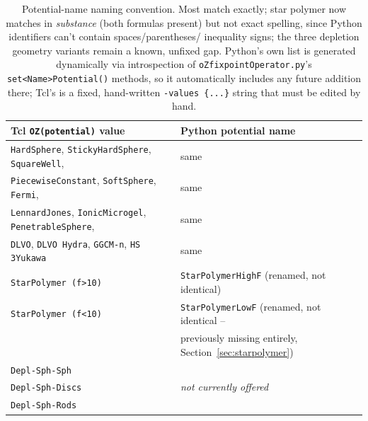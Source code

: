 \documentclass[11pt,a4paper]{article}
\newcommand{\code}[1]{\texttt{#1}}
\begin{document}
\begin{table}[h]
\centering
\small
\begin{tabular}{ll}
\toprule
Tcl \code{OZ(potential)} value & Python potential name \\
\midrule
\code{HardSphere}, \code{StickyHardSphere}, \code{SquareWell}, & same \\
\code{PiecewiseConstant}, \code{SoftSphere}, \code{Fermi}, & same \\
\code{LennardJones}, \code{IonicMicrogel}, \code{PenetrableSphere}, & same \\
\code{DLVO}, \code{DLVO Hydra}, \code{GGCM-n}, \code{HS 3Yukawa} & same \\
\code{StarPolymer (f>10)} & \code{StarPolymerHighF} (renamed, not identical) \\
\code{StarPolymer (f<10)} & \code{StarPolymerLowF} (renamed, not identical --\\
& previously missing entirely, Section~\ref{sec:starpolymer}) \\
\code{Depl-Sph-Sph} & \multirow{3}{*}{\emph{not currently offered}} \\
\code{Depl-Sph-Discs} & \\
\code{Depl-Sph-Rods} & (Section~\ref{sec:depletion}'s Known gap) \\
\bottomrule
\end{tabular}
\caption{Potential-name naming convention. Most match exactly; star polymer
now matches in \emph{substance} (both formulas present) but not exact
spelling, since Python identifiers can't contain spaces/parentheses/
inequality signs; the three depletion geometry variants remain a known,
unfixed gap. Python's own list is generated dynamically via introspection
of \code{oZfixpointOperator.py}'s \code{set<Name>Potential()} methods, so
it automatically includes any future addition there; Tcl's is a fixed,
hand-written \code{-values \{...\}} string that must be edited by hand.}
\label{tab:potential-naming}
\end{table}
\end{document}
